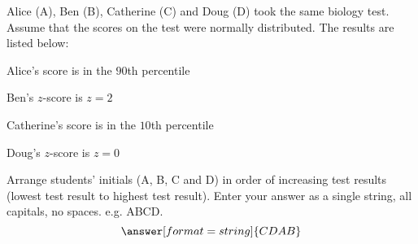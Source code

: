 \documentclass{ximera}
\begin{document}
\begin{problem}\label{prob:140hom3prob4}

Alice (A), Ben (B), Catherine (C) and Doug (D) took the same biology test.  Assume that the scores on the test were normally distributed.  The results are listed below: 

Alice's score is in the $90$th percentile 

Ben's $z$-score is $z = 2$ 

Catherine's score is in the $10$th percentile 

Doug's $z$-score is $z = 0$

Arrange students’ initials (A, B, C and D) in order of increasing test results (lowest test result to highest test result).  Enter your answer as a single string, all capitals, no spaces.  e.g. ABCD.
$$\answer[format=string]{CDAB}$$
\end{problem}
\end{document}
